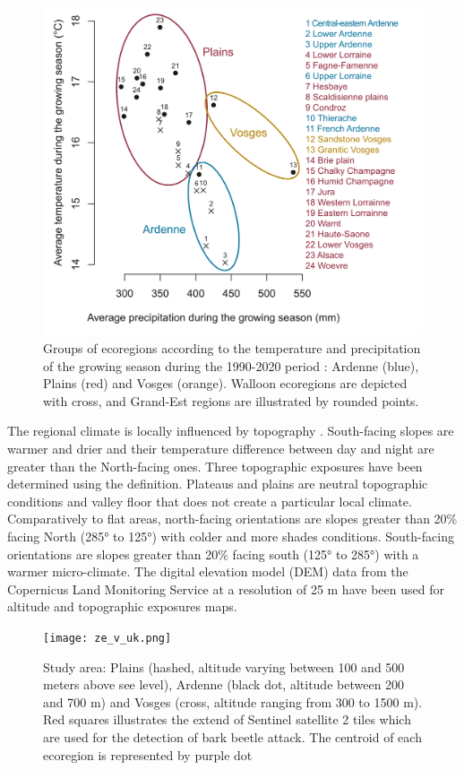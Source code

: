 \documentclass[3p,procedia]{elsarticle}
\begin{document}
\begin{figure}[htbp] 
	\centering
	\includegraphics[width=0.8\linewidth]{climat/climat_region.png}
	\caption{Groups of ecoregions according to the temperature and precipitation of the growing season during the 1990-2020 period : Ardenne (blue), Plains (red) and Vosges (orange). Walloon ecoregions are depicted with cross, and Grand-Est regions are illustrated by rounded points.}
	\label{fig:clim}
\end{figure}
The regional climate is locally influenced by topography \citep{de_frenne_forest_2021}.
South-facing slopes are warmer and drier and their temperature difference between day and night are greater than the North-facing ones.
Three topographic exposures have been determined using the \cite{Delvaux_galoux} definition.
Plateaus and plains are neutral topographic conditions and valley floor that does not create a particular local climate.
Comparatively to flat areas, north-facing orientations are slopes greater than  20\% facing North (285° to 125°) with colder and more shades conditions.
South-facing orientations are slopes greater than  20\% facing south (125° to 285°) with a warmer micro-climate.
The digital elevation model (DEM) data from the Copernicus Land Monitoring Service \citep{DEM_copernicus} at a resolution of 25 m have been used for altitude and topographic exposures maps.
\begin{figure} [htbp] 
	\centering
	\texttt{[image: ze\_v\_uk.png]}
	\caption{Study area: Plains (hashed, altitude varying between 100 and 500 meters above see level), Ardenne (black dot, altitude between 200 and 700 m) and Vosges (cross, altitude ranging from 300 to 1500 m). Red squares illustrates the extend of Sentinel satellite 2 tiles which are used for the detection of bark beetle attack. The centroid of each ecoregion is represented by purple dot}
	\label{fig:situ}
\end{figure}
\end{document}
